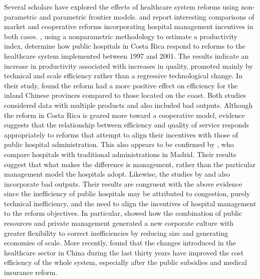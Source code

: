 \documentclass[11pt,a4paper,oneside]{article}
\begin{document}
Several scholars have explored the effects of healthcare system reforms using non-parametric and parametric frontier models. \cite{Arocena:2007gq} and \cite{Hu:2012bl} report interesting comparisons of market and cooperative reforms incorporating hospital management incentives in both cases. \cite{Arocena:2007gq}, using a nonparametric methodology to estimate a productivity index, determine how public hospitals in Costa Rica respond to reforms to the healthcare system implemented between 1997 and 2001. The results indicate an increase in productivity associated with increases in quality, promoted mainly by technical and scale efficiency rather than a regressive technological change. In their study, \cite{Hu:2012bl} found the reform had a more positive effect on efficiency for the inland Chinese provinces compared to those located on the coast. Both studies considered data with multiple products and also included bad outputs. Although the reform in Costa Rica is geared more toward a cooperative model, evidence suggests that the relationship between efficiency and quality of service responds appropriately to reforms that attempt to align their incentives with those of public hospital administration. This also appears to be confirmed by \cite{Alonso:2015bga}, who compare hospitals with traditional administrations in Madrid. Their results suggest that what makes the difference is management, rather than the particular management model the hospitals adopt. Likewise, the studies by \cite{Matranga:2015jv} and \cite{Fidler:2007go} also incorporate bad outputs. Their results are congruent with the above evidence since the inefficiency of public hospitals may be attributed to congestion, purely technical inefficiency, and the need to align the incentives of hospital management to the reform objectives. In particular, \cite{Fidler:2007go} showed how the combination of public resources and private management generated a new corporate culture with greater flexibility to correct inefficiencies by reducing size and generating economies of scale. More recently, \cite{Chen:2016jv} found that the changes introduced in the healthcare sector in China during the last thirty years have improved the cost efficiency of the whole system, especially after the public subsidies and medical insurance reform.
\end{document}
